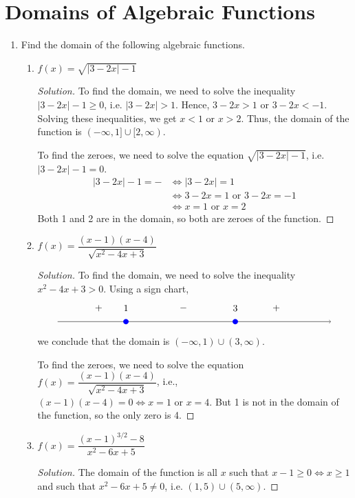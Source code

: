 \documentclass[12pt]{article}
\newenvironment{solution}{\begin{proof}[Solution]}{\end{proof}}
\begin{document}
			\section{Domains of Algebraic Functions}
		\begin{enumerate}
			\item Find the domain of the following algebraic functions.
			
			\begin{enumerate}
				\item $f(x)=\sqrt{|3-2x|-1}$
				\begin{solution}
					To find the domain, we need to solve the inequality $|3-2x|-1\geq 0$, i.e. $|3-2x|>1$. Hence, $3-2x>1$ or $3-2x<-1$. Solving these inequalities, we get $x<1$ or $x>2$. Thus, the domain of the function is $(-\infty,1]\cup[2,\infty)$.
					
					To find the zeroes, we need to solve the equation $\sqrt{|3-2x|-1}$, i.e. $|3-2x|-1=0$. 
					\begin{align*}
						|3-2x|-1=- &\iff |3-2x|=1\\
						&\iff 3-2x=1 \text{ or } 3-2x=-1\\
						&\iff x=1 \text{ or } x=2
					\end{align*}
					Both 1 and 2 are in the domain, so both are zeroes of the function.
				\end{solution}
				\item $f(x)=\dfrac{(x-1)(x-4)}{\sqrt{x^2-4x+3}}$
				\begin{solution}
					To find the domain, we need to solve the inequality $x^2-4x+3>0$. Using a sign chart,
					\[
					\begin{tikzpicture}[scale=1]
						\draw[->] (-5,0) -- (5,0);
						
						\draw (-2.5,0) node[circle,blue,fill,inner sep=2pt]{};
						\draw (1.5,0) node[circle,blue,fill,inner sep=2pt]{};
						
						\node at (-2.5, .5) {1};
						\node at (1.5, .5) {3};
						\node at (-3.5,.5) {$+$};
						\node at (-0.4,.5) {$-$};
						\node at (3, .5) {$+$};
					\end{tikzpicture}
					\]
					we conclude that the domain is $(-\infty,1)\cup(3,\infty)$.
					
					To find the zeroes, we need to solve the equation $f(x)=\dfrac{(x-1)(x-4)}{\sqrt{x^2-4x+3}}$, i.e., $(x-1)(x-4)=0\iff x=1 \text{ or } x=4$. But 1 is not in the domain of the function, so the only zero is 4.
				\end{solution}
				\item $f(x)=\dfrac{(x-1)^{3/2}-8}{x^2-6x+5}$
				\begin{solution}
					The domain of the function is all $x$ such that $x-1\geq 0\iff x\geq 1$ and such that $x^2-6x+5\neq 0$, i.e. $(1,5)\cup(5,\infty)$.
					

\end{solution}
\end{enumerate}
\end{enumerate}
\end{document}
